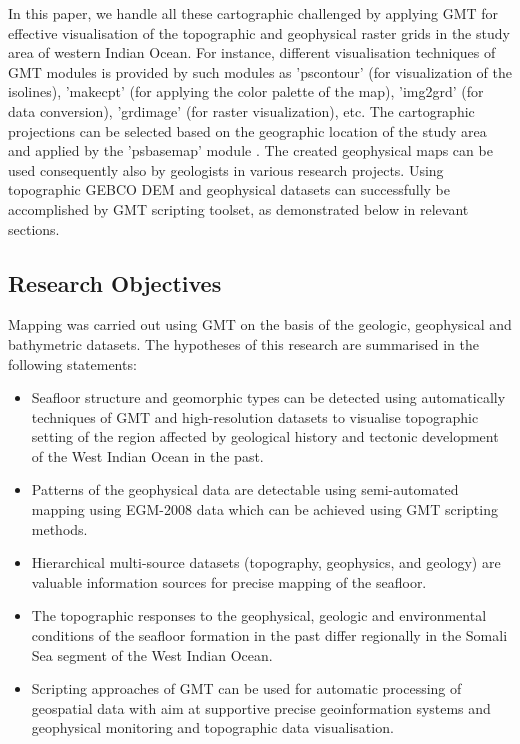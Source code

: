 \documentclass[]{interact}
\begin{document}
In this paper, we handle all these cartographic challenged by applying GMT for effective visualisation of the topographic and geophysical raster grids in the study area of western Indian Ocean. For instance, different visualisation techniques of GMT modules is provided by such modules as 'pscontour' (for visualization of the isolines), 'makecpt' (for applying the color palette of the map), 'img2grd' (for data conversion), 'grdimage' (for raster visualization), etc. The cartographic projections can be selected based on the geographic location of the study area and applied by the 'psbasemap' module \cite{Lemenkova2019d}. The created geophysical maps can be used consequently also by geologists in various research projects. Using topographic GEBCO DEM and geophysical datasets can successfully be accomplished by GMT scripting toolset, as demonstrated below in relevant sections. 

\subsection{Research Objectives}
Mapping was carried out using GMT on the basis of the geologic, geophysical and bathymetric datasets.  
The hypotheses of this research are summarised in the following statements:

\begin{itemize}
     \item Seafloor structure and geomorphic types can be  detected using automatically techniques of GMT and high-resolution datasets to visualise topographic setting of the region affected by geological history and tectonic development of the West Indian Ocean in the past.
    \item Patterns of the geophysical data are detectable using semi-automated mapping using EGM-2008 data which can be achieved using GMT scripting methods.
    \item Hierarchical multi-source datasets (topography, geophysics, and geology) are valuable information sources for precise mapping of the seafloor.
    \item The topographic responses to the geophysical, geologic and environmental conditions of the seafloor formation in the past differ regionally in the Somali Sea segment of the West Indian Ocean.
    \item Scripting approaches of GMT can be used for automatic processing of geospatial data with aim at supportive precise geoinformation systems and geophysical monitoring and topographic data visualisation.
 \end{itemize} 
    
\end{document}
